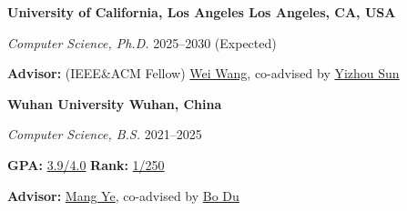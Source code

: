 \textbf{University of California, Los Angeles \hfill Los Angeles, CA, USA} \par
\textit{Computer Science, Ph.D.}   \hfill 2025--2030 (Expected)\par
\textbf{Advisor:} (IEEE\&ACM Fellow) \href{https://scholar.google.com/citations?view_op=list_works&hl=en&hl=en&user=UedS9LQAAAAJ}{Wei Wang}, co-advised by \href{https://scholar.google.com/citations?hl=en&user=TQgOjK0AAAAJ}{Yizhou Sun}    

\vspace{0.5em} 

\textbf{Wuhan University \hfill Wuhan, China} \par
\textit{Computer Science, B.S.}   \hfill 2021--2025\par
\textbf{GPA:} \href{https://github.com/GuanchengWan/guanchengWan.github.io/raw/master/docs/GPA.pdf}{3.9/4.0}    \quad \textbf{Rank:} \href{https://github.com/GuanchengWan/guanchengWan.github.io/raw/master/docs/Rank.pdf}{1/250} \par
\textbf{Advisor:} \href{https://scholar.google.com/citations?user=j-HxRy0AAAAJ&hl=en}{Mang Ye}, co-advised by \href{https://scholar.google.com/citations?user=Shy1gnMAAAAJ&hl=en}{Bo Du} 

